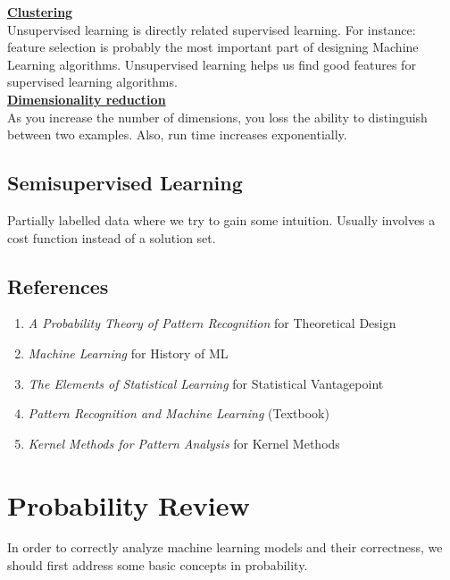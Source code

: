 \documentclass[12pt]{article}
\newcommand{\aside}[1]{\noindent\textbf{\underline{#1}}}
\begin{document}
\aside{Clustering} \\

Unsupervised learning is directly related supervised learning. For instance: feature selection is probably the most important part of designing Machine Learning algorithms. Unsupervised learning helps us find good features for supervised learning algorithms. \\

\aside{Dimensionality reduction} \\
As you increase the number of dimensions, you loss the ability to distinguish between two examples. Also, run time increases exponentially.

\subsection{Semisupervised Learning}

Partially labelled data where we try to gain some intuition. Usually involves a cost function instead of a solution set.


\subsection{References}

\begin{enumerate}[noitemsep]
\item \textit{A Probability Theory of Pattern Recognition} for Theoretical Design
\item \textit{Machine Learning} for History of ML
\item \textit{The Elements of Statistical Learning} for Statistical Vantagepoint
\item \textit{Pattern Recognition and Machine Learning} (Textbook)
\item \textit{Kernel Methods for Pattern Analysis} for Kernel Methods
\end{enumerate}

\section{Probability Review}

In order to correctly analyze machine learning models and their correctness, we should first address some basic concepts in probability.
\\
\end{document}
